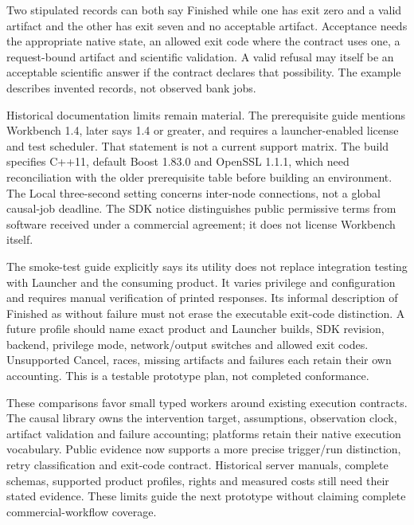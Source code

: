 Two stipulated records can both say Finished while one has exit zero and
a valid artifact and the other has exit seven and no acceptable artifact.
Acceptance needs the appropriate native state, an allowed exit code where
the contract uses one, a request-bound artifact and scientific validation.
A valid refusal may itself be an acceptable scientific answer if the contract
declares that possibility. The example describes invented records, not
observed bank jobs.~\citep{exec24_workflow_contracts_reference}

Historical documentation limits remain material. The prerequisite guide
mentions Workbench 1.4, later says 1.4 or greater, and requires a launcher-enabled
license and test scheduler. That statement is not a current support matrix.
The build specifies C++11, default Boost 1.83.0 and OpenSSL 1.1.1, which need
reconciliation with the older prerequisite table before building an environment.
The Local three-second setting concerns inter-node connections, not a global
causal-job deadline. The SDK notice distinguishes public permissive terms
from software received under a commercial agreement; it does not license
Workbench itself.~\citep{exec24_workflow_contracts_posit}

The smoke-test guide explicitly says its utility does not replace integration
testing with Launcher and the consuming product. It varies privilege and
configuration and requires manual verification of printed responses. Its
informal description of Finished as without failure must not erase the
executable exit-code distinction. A future profile should name exact product
and Launcher builds, SDK revision, backend, privilege mode, network/output
switches and allowed exit codes. Unsupported Cancel, races, missing artifacts
and failures each retain their own accounting. This is a testable prototype
plan, not completed conformance.~\citep{exec24_workflow_contracts_posit}

These comparisons favor small typed workers around existing execution
contracts. The causal library owns the intervention target, assumptions,
observation clock, artifact validation and failure accounting; platforms
retain their native execution vocabulary. Public evidence now supports a
more precise trigger/run distinction, retry classification and exit-code
contract. Historical server manuals, complete schemas, supported product
profiles, rights and measured costs still need their stated evidence. These
limits guide the next prototype without claiming complete commercial-workflow
coverage.
